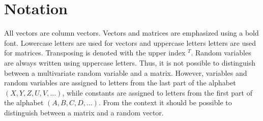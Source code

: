 \section*{Notation}

All vectors are column vectors. Vectors and matrices are emphasized using a bold font. Lowercase letters are used for vectors and uppercase letters letters are used for matrices. Transposing is denoted with the upper index $^T$. Random variables are always written using uppercase letters. Thus, it is not possible to distinguish between a multivariate random variable and a matrix. However, variables and random variables are assigned to letters from the last part of the alphabet $(X, Y, Z, U, V, \dots)$, while constants are assigned to letters from the first part of the alphabet $(A, B, C, D, \dots)$. From the context it should be possible to distinguish between a matrix and a random vector.